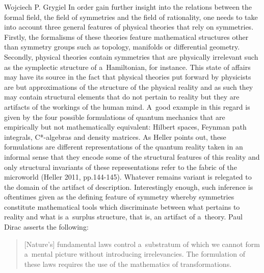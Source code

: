 \begin{artengenv}{Wojciech P. Grygiel}
In order gain further insight into the relations between the formal field, the field of symmetries and the field of rationality, one needs to take into account three general features of physical theories that rely on symmetries. Firstly, the formalisms of these theories feature mathematical structures other than symmetry groups such as topology, manifolds or differential geometry. Secondly, physical theories contain symmetries that are physically irrelevant such as the symplectic structure of a~Hamiltonian, for instance. This state of affairs may have its source in the fact that physical theories put forward by physicists are but approximations of the structure of the physical reality and as such they may contain structural elements that do not pertain to reality but they are artifacts of the workings of the human mind. A~good example in this regard is given by the four possible formulations of quantum mechanics that are empirically but not mathematically equivalent: Hilbert spaces, Feynman path integrals, C*-algebras and density matrices. As Heller points out, these formulations are different representations of the quantum reality taken in an informal sense that they encode some of the structural features of this reality and only structural invariants of these representations refer to the fabric of the microworld (Heller 2011, pp.144-145). Whatever remains variant is relegated to the domain of the artifact of description. Interestingly enough, such inference is oftentimes given as the defining feature of symmetry whereby symmetries constitute mathematical tools which discriminate between what pertains to reality and what is a~surplus structure, that is, an artifact of a~theory. Paul Dirac 
\parencite*[][p.vii]{dirac_principles_1930} %
 asserts the following:



\begin{quote}
[Nature's] fundamental laws control a~substratum of which we cannot form a~mental picture without introducing irrelevancies. The formulation of these laws requires the use of the mathematics of transformations.
\end{quote}




\end{artengenv}
